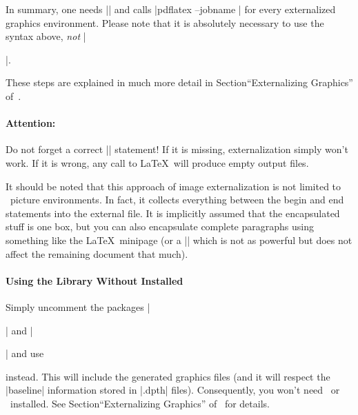 {In summary, one needs |\pgfrealjobname| and calls |pdflatex --jobname | for every externalized graphics environment. Please note that it is absolutely necessary to use the syntax above, \emph{not} |\begin{pgfgraphicnamed}|.

These steps are explained in much more detail in Section``Externalizing Graphics'' of~\cite{tikz}.

\paragraph{Attention:} Do not forget a correct |\pgfrealjobname| statement! If it is missing, externalization simply won't work. If it is wrong, any call to \LaTeX\ will produce empty output files.

It should be noted that this approach of image externalization is not limited to \Tikz\ picture environments. In fact, it collects everything between the begin and end statements into the external file. It is implicitly assumed that the encapsulated stuff is one box, but you can also encapsulate complete paragraphs using something like the \LaTeX\ minipage (or a |\vbox| which is not as powerful but does not affect the remaining document that much).


\paragraph{Using the Library Without {\normalfont\pgfname} Installed}
Simply uncomment the packages |\usepackage{tikz}| and |\usepackage{pgfplots}| and use
\begin{codeexample}
\long{}
\end{codeexample}
instead. This will include the generated graphics files (and it will respect the |baseline| information stored in |.dpth| files). Consequently, you won't need \pgfname\ or \PGFPlots\ installed. See Section``Externalizing Graphics'' of~\cite{tikz} for details.


\end{pgfgraphicnamed}}
